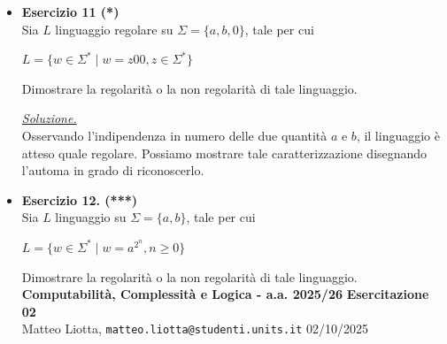 \documentclass[a4paper,10pt]{article}
\newcommand{\EsercitazioneNum}{02}
\newcommand{\Data}{02/10/2025}
\begin{document}
{\begin{itemize}[label=, leftmargin=0pt]
\begin{osservazioni}
    \end{osservazioni}

    \item \textbf{Esercizio 11 (*)}\\ Sia $L$ linguaggio regolare su $\Sigma=\{a,b,0\}$, tale per cui 
    {\begin{center}
        $L = \{ w \in \Sigma^* \mid w = z00, z \in \Sigma^* \}$
    \end{center}} 
    Dimostrare la regolarità o la non regolarità di tale linguaggio.\\[0.1cm]


    \begin{osservazioni}
        \underline{\textit{Soluzione.}}\\
        Osservando l'indipendenza in numero delle due quantità $a$ e $b$, il linguaggio è atteso quale regolare. Possiamo mostrare tale caratterizzazione disegnando l'automa in grado di riconoscerlo.
            {
    \small
    \begin{center}
    \end{center}
    }
    \end{osservazioni}

    \item \textbf{Esercizio 12. (***)}\\ Sia $L$ linguaggio su $\Sigma=\{a,b\}$, tale per cui 
    {\begin{center}
        $L = \{ w \in \Sigma^* \mid w = a^{2^n}, n\geq 0\}$
    \end{center}} 
    Dimostrare la regolarità o la non regolarità di tale linguaggio.\\[0.1cm]

    \vfill
    \noindent\makebox[\linewidth]{\rule{\linewidth}{0.4pt}}
    \newpage
    {\noindent
    \small \textbf{Computabilità, Complessità e Logica - a.a. 2025/26} \hfill \textbf{Esercitazione \EsercitazioneNum} \\[0.2cm]
    \scriptsize Matteo Liotta, \texttt{matteo.liotta@studenti.units.it} \hfill \Data \\[0.2cm]
    \noindent\makebox[\linewidth]{\rule{\linewidth}{0.4pt}} \\[0.3cm]}




\end{itemize}}
\end{document}
